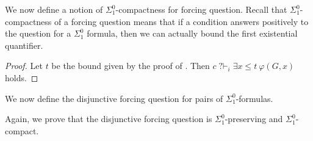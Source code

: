 \documentclass{article}
\newcommand{\qvdash}{\operatorname{{?}{\vdash}}}
\newcommand{\nqvdash}{\operatorname{{?}{\nvdash}}}
\newcommand{\WKL}[0]{\mathsf{WKL}}
\newcommand{\NN}[0]{\mathbb{N}}
\def\N{\mathbb{N}}
\def\NN{\mathbb{N}}
\numberwithin{theorem}{section}
\newtheorem{lemma}[theorem]{Lemma}
\theoremstyle{definition}
\newtheorem{definition}[theorem]{Definition}
\begin{document}
We now define a notion of $\Sigma^0_1$-compactness for forcing question. Recall that $\Sigma^0_1$-compactness of a forcing question means that if a condition answers positively to the question for a $\Sigma_1^0$ formula, then we can actually bound the first existential quantifier. %


\begin{proof}
Let $t$ be the bound given by the proof of . Then $c \qvdash_i \exists x \leq t \ \varphi(G,x)$ holds.
\end{proof}

We now define the disjunctive forcing question for pairs of $\Sigma^0_1$-formulas.


Again, we prove that the disjunctive forcing question is $\Sigma^0_1$-preserving and $\Sigma^0_1$-compact.
\end{document}
